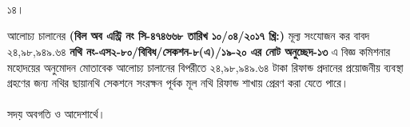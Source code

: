 \documentclass[12pt]{article}
\begin{document}
\\
\\
\\
\begin{minipage}[t]{0.05\linewidth}
১৪।
\end{minipage}
\begin{minipage}[t]{1\linewidth}
আলোচ্য চালানের
\textbf{(বিল অব এন্ট্রি নং সি-৪৭৪৬৬৮ তারিখ ১০/০৪/২০১৭ খ্রি:)}
মূল্য সংযোজন কর বাবদ
২৪,৯৮,৯৪৯.৬৪
\textbf{নথি নং-এস২-৮০/বিবিধ/সেকশন-৮(এ)/১৯-২০
এর নোট অনুচ্ছেদ-১৩} এ বিজ্ঞ কমিশনার মহোদয়ের
অনুমোদন মোতাবেক আলোচ্য চালানের
বিপরীতে
২৪,৯৮,৯৪৯.৬৪ টাকা
রিফান্ড প্রদানের প্রয়োজনীয় ব্যবস্থা গ্রহণের জন্য
নথির ছায়ানথি সেকশনে সংরক্ষন পূর্বক
মূল নথি রিফান্ড শাখায় প্রেরণ করা যেতে পারে।
\\
\\
সদয় অবগতি ও আদেশার্থে।
\end{minipage}

\thispagestyle{laststyle}
\end{document}
